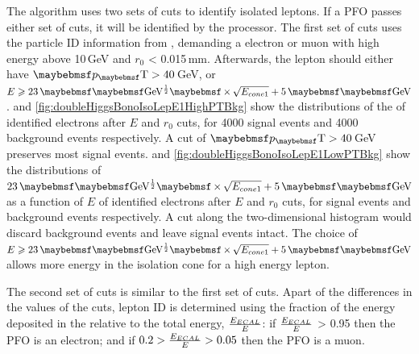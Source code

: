 The algorithm uses two sets of cuts to identify isolated leptons. If a PFO passes either set of cuts, it will be identified by the processor. The first set of cuts uses the particle ID information from \pandora, demanding a \pandora electron or muon with high energy above 10\,GeV and $r_0$ < 0.015\,mm. Afterwards, the lepton should either have $\pT > 40$\,GeV, or $E \geqslant 23\,\uprightMath{GeV^{\frac{1}{2}}} \times \sqrt{E_{cone1}} + 5\,\uprightMath{GeV}$.  and \ref{fig:doubleHiggsBonoIsoLepE1HighPTBkg} show the distributions of the \pT of identified electrons after  $E$  and $r_0$ cuts, for 4000 \eeToHHbbWWHad signal events  and 4000 \eeTo{ \Pquark \Pquark \Pquark \Pquark \Plepton \Pnu}  background events respectively. A cut of $\pT > 40$\,GeV preserves most signal events.  and \ref{fig:doubleHiggsBonoIsoLepE1LowPTBkg} show the distributions of $23\,\uprightMath{GeV^{\frac{1}{2}}} \times \sqrt{E_{cone1}} + 5\,\uprightMath{GeV}$ as a function of $E$ of identified electrons after  $E$  and $r_0$ cuts, for  \eeToHHbbWWHad signal events and \eeTo{ \Pquark \Pquark \Pquark \Pquark \Plepton \Pnu}  background events respectively. A cut along the two-dimensional histogram would discard background events and leave signal events intact. The choice of  $E \geqslant 23\,\uprightMath{GeV^{\frac{1}{2}}} \times \sqrt{E_{cone1}} + 5\,\uprightMath{GeV}$ allows more energy in the isolation cone for a high energy lepton.


The second set of cuts is similar to the first set of cuts. Apart of the differences in the values of the cuts, lepton ID is determined using the fraction of the energy deposited in the \ECAL relative to the total energy,  $\frac{E_{ECAL}}{E}$: if $\frac{E_{ECAL}}{E}$  > 0.95 then the PFO is an electron; and if  $0.2 > \frac{E_{ECAL}}{E} > 0.05$  then the PFO is a muon.





